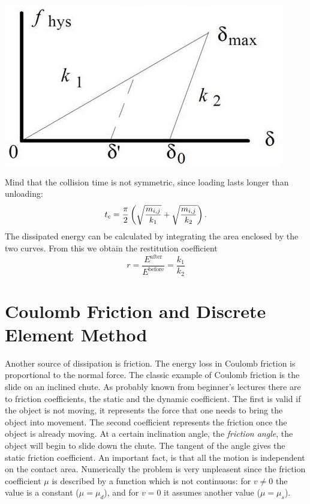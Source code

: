 \vspace{0.1cm}
\noindent
\begin{minipage}{\textwidth}
\begin{minipage}{\textwidth}
  \centering
  \includegraphics[width=.55\textwidth]{pics/deformation.jpeg}
  \label{fig:plasticity2}
\end{minipage}
\end{minipage}
\vspace{0.1cm}


Mind that the collision time is not symmetric, since loading lasts longer than unloading:
\begin{equation}
t_c = \frac{\pi}{2} \left( \sqrt{\frac{m_{i,j}}{k_1}} + \sqrt{\frac{m_{i,j}}{k_2}}  \right).
\end{equation}
The dissipated energy can be calculated by integrating the area enclosed by the two curves. From this we obtain the restitution coefficient
\begin{equation}
r= \frac{E^{\text{after}}}{E^{\text{before}}} = \frac{k_1}{k_2}
\end{equation}




\section{Coulomb Friction and Discrete Element Method}


Another source of dissipation is friction. The energy loss in Coulomb friction is proportional to the normal force. The classic example of Coulomb friction is the slide on an inclined chute. As probably known from beginner's lectures there are to friction coefficients, the static and the dynamic coefficient. The first is valid if the object is not moving, it represents the force that one needs to bring the object into movement. The second coefficient represents the friction once the object is already moving. At a certain inclination angle, the \emph{friction angle}, the object will begin to slide down the chute. The tangent of the angle gives the static friction coefficient. An important fact, is that all the motion is independent on the contact area. Numerically the problem is very unpleasent since the friction coefficient $\mu$   is described by a function which is not continuous: for $v\ne 0$ the value is a constant ($\mu=\mu_d$), and for $v=0$ it assumes another value ($\mu= \mu_s$).



